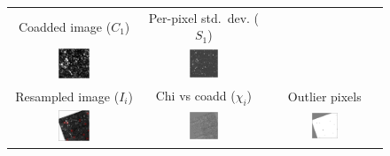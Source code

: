 \documentclass[11pt,preprint]{aastex}
\newcommand{\fimg}[1]{#1}
\newcommand{\img}{\fimg{I}}
\newcommand{\coadd}{\fimg{C}}
\newcommand{\ppchi}{\fimg{\chi}}
\newcommand{\copp}{\fimg{S}}
\begin{document}
\begin{figure}
\begin{center}
\begin{tabular}{@{}ccc@{}}
Coadded image ($\coadd_1$) &
Per-pixel std.~dev. ($\copp_1$) &
\\
\includegraphics[width=0.25\textwidth]{plots1/sequels-024} &
\includegraphics[width=0.25\textwidth]{plots1/sequels-026} &
\\
Resampled image ($\img_i$) & Chi vs coadd ($\ppchi_i$) & Outlier pixels \\
\includegraphics[width=0.25\textwidth]{plots1/sequels-027} &
\includegraphics[width=0.25\textwidth]{plots1/sequels-029} &
\includegraphics[width=0.25\textwidth]{plots1/sequels-030} \\

\end{tabular}
\end{center}
\end{figure}
\end{document}
